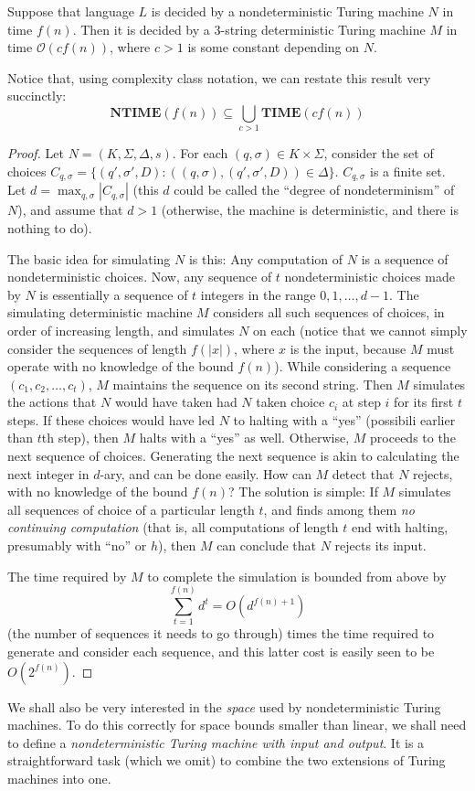 \documentclass[12pt]{article}
\begin{document}
\begin{defbox}
  Suppose that language $L$ is decided by a nondeterministic Turing machine $N$ in time $f(n)$. Then it is decided by a 3-string deterministic Turing machine $M$ in time $\mathcal{O}(cf(n))$, where $c > 1$ is some constant depending on $N$.

Notice that, using complexity class notation, we can restate this result very succinctly:
\[
\textbf{NTIME}(f(n)) \subseteq \bigcup_{c > 1} \textbf{TIME}(cf(n))
\]
\end{defbox}
\begin{proof}
  Let $N = (K, \Sigma, \Delta, s)$. For each $(q, \sigma) \in K \times \Sigma$, consider the set of choices $C_{q,\sigma} = \{(q', \sigma', D) : ((q, \sigma), (q', \sigma', D)) \in \Delta\}$. $C_{q,\sigma}$ is a finite set. Let $d = \max_{q,\sigma} |C_{q,\sigma}|$ (this $d$ could be called the ``degree of nondeterminism'' of $N$), and assume that $d > 1$ (otherwise, the machine is deterministic, and there is nothing to do).

The basic idea for simulating $N$ is this: Any computation of $N$ is a sequence of nondeterministic choices. Now, any sequence of $t$ nondeterministic choices made by $N$ is essentially a sequence of $t$ integers in the range $0, 1, \ldots, d - 1$. The simulating deterministic machine $M$ considers all such sequences of choices, in order of increasing length, and simulates $N$ on each (notice that we cannot simply consider the sequences of length $f(|x|)$, where $x$ is the input, because $M$ must operate with no knowledge of the bound $f(n)$). While considering a sequence $(c_1, c_2, \ldots, c_t)$, $M$ maintains the sequence on its second string. Then $M$ simulates the actions that $N$ would have taken had $N$ taken choice $c_i$ at step $i$ for its first $t$ steps. If these choices would have led $N$ to halting with a ``yes'' (possibili earlier than $t$th step), then $M$ halts with a ``yes'' as well. Otherwise, $M$  proceeds to the next sequence of choices. Generating the next sequence is akin to calculating the next integer in $d$-ary, and can be done easily.
How can $M$ detect that $N$ rejects, with no knowledge of the bound $f(n)$? 
The solution is simple: If $M$ simulates all sequences of choice of a particular 
length $t$, and finds among them \textit{no continuing computation} (that is, all 
computations of length $t$ end with halting, presumably with ``no'' or $h$), then $M$ can 
conclude that $N$ rejects its input.

The time required by $M$ to complete the simulation is bounded from above 
by 
\[
\sum_{t=1}^{f(n)} d^t = O(d^{f(n)+1})
\]
(the number of sequences it needs to go through) times the time required to generate and consider each sequence, and this latter cost is easily seen to be $O(2^{f(n)})$.
\end{proof}
We shall also be very interested in the \textit{space} used by nondeterministic 
Turing machines. To do this correctly for space bounds smaller than linear, we 
shall need to define a \textit{nondeterministic Turing machine with input and output}. 
It is a straightforward task (which we omit) to combine the two extensions of 
Turing machines into one.
\end{document}
